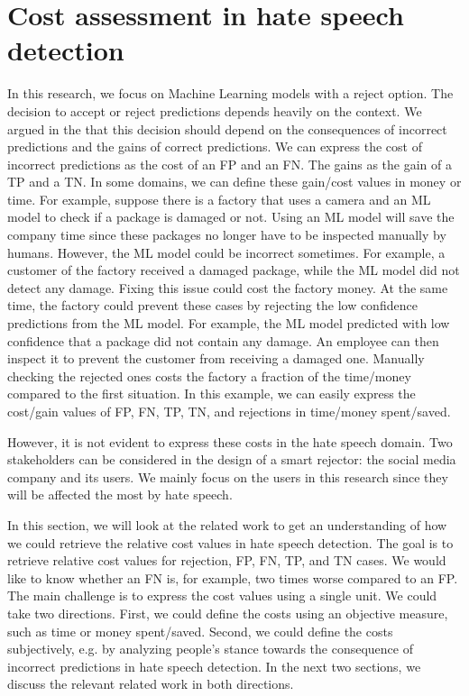 \section{Cost assessment in hate speech detection}

In this research, we focus on Machine Learning models with a reject option. The decision to accept or reject predictions depends heavily on the context. We argued in the  that this decision should depend on the consequences of incorrect predictions and the gains of correct predictions. We can express the cost of incorrect predictions as the cost of an FP and an FN. The gains as the gain of a TP and a TN. In some domains, we can define these gain/cost values in money or time. For example, suppose there is a factory that uses a camera and an ML model to check if a package is damaged or not. Using an ML model will save the company time since these packages no longer have to be inspected manually by humans. However, the ML model could be incorrect sometimes. For example, a customer of the factory received a damaged package, while the ML model did not detect any damage. Fixing this issue could cost the factory money. At the same time, the factory could prevent these cases by rejecting the low confidence predictions from the ML model. For example, the ML model predicted with low confidence that a package did not contain any damage. An employee can then inspect it to prevent the customer from receiving a damaged one. Manually checking the rejected ones costs the factory a fraction of the time/money compared to the first situation. In this example, we can easily express the cost/gain values of FP, FN, TP, TN, and rejections in time/money spent/saved.

However, it is not evident to express these costs in the hate speech domain. Two stakeholders can be considered in the design of a smart rejector: the social media company and its users. We mainly focus on the users in this research since they will be affected the most by hate speech.

In this section, we will look at the related work to get an understanding of how we could retrieve the relative cost values in hate speech detection. The goal is to retrieve relative cost values for rejection, FP, FN, TP, and TN cases. We would like to know whether an FN is, for example, two times worse compared to an FP. The main challenge is to express the cost values using a single unit. We could take two directions. First, we could define the costs using an objective measure, such as time or money spent/saved. Second, we could define the costs subjectively, e.g. by analyzing people’s stance towards the consequence of incorrect predictions in hate speech detection. In the next two sections, we discuss the relevant related work in both directions.

